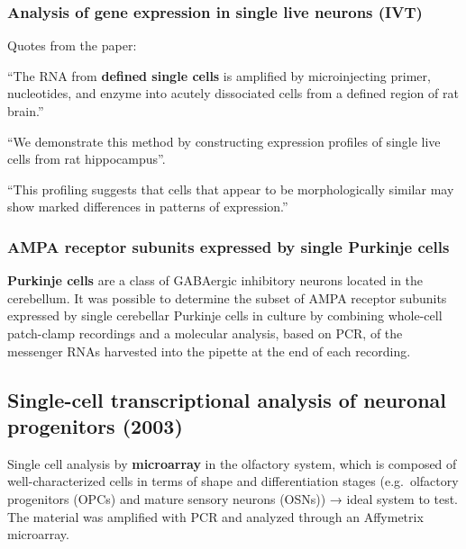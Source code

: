 \hypertarget{analysis-of-gene-expression-in-single-live-neurons-ivt}{%
\subsubsection{\texorpdfstring{\textbf{Analysis of gene expression in
single live neurons
(IVT)}}{Analysis of gene expression in single live neurons (IVT)}}\label{analysis-of-gene-expression-in-single-live-neurons-ivt}}

Quotes from the paper:

``The RNA from \textbf{defined single cells} is amplified by
microinjecting primer, nucleotides, and enzyme into acutely dissociated
cells from a defined region of rat brain.''

``We demonstrate this method by constructing expression profiles of
single live cells from rat hippocampus''.

``This profiling suggests that cells that appear to be morphologically
similar may show marked differences in patterns of expression.''

\hypertarget{ampa-receptor-subunits-expressed-by-single-purkinje-cells}{%
\subsubsection{AMPA receptor subunits expressed by single Purkinje
cells}\label{ampa-receptor-subunits-expressed-by-single-purkinje-cells}}

\textbf{Purkinje cells} are a class of GABAergic inhibitory neurons
located in the cerebellum. It was possible to determine the subset of
AMPA receptor subunits expressed by single cerebellar Purkinje cells in
culture by combining whole-cell patch-clamp recordings and a molecular
analysis, based on PCR, of the messenger RNAs harvested into the pipette
at the end of each recording.

\hypertarget{single-cell-transcriptional-analysis-of-neuronal-progenitors-2003}{%
\subsection{Single-cell transcriptional analysis of neuronal progenitors
(2003)}\label{single-cell-transcriptional-analysis-of-neuronal-progenitors-2003}}

Single cell analysis by \textbf{microarray} in the olfactory system,
which is composed of well-characterized cells in terms of shape and
differentiation stages (e.g.~olfactory progenitors (OPCs) and mature
sensory neurons (OSNs)) → ideal system to test. The material was
amplified with PCR and analyzed through an Affymetrix microarray.


